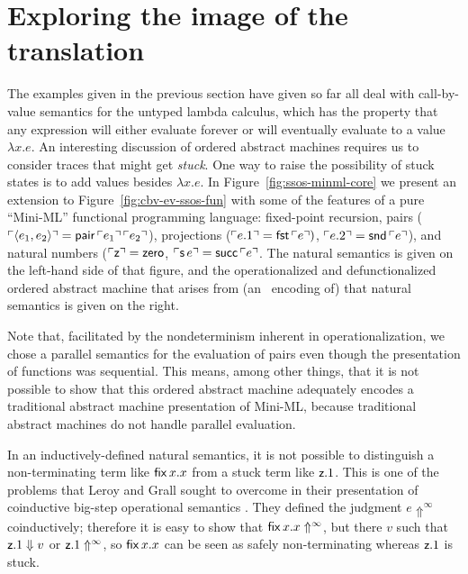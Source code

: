 \section{Exploring the image of the translation}
\label{sec:absmachine-nondeterminism}

The examples given in the previous section have given so far all deal
with call-by-value semantics for the untyped lambda calculus, which
has the property that any expression will either evaluate forever or
will eventually evaluate to a value $\lambda x. e$. An interesting
discussion of ordered abstract machines requires us to consider traces
that might get {\it stuck}. One way to raise the possibility of stuck
states is to add values besides $\lambda x.e$. In
Figure~\ref{fig:ssos-minml-core} we present an extension to
Figure~\ref{fig:cbv-ev-ssos-fun} with some of the features of a pure
``Mini-ML'' functional programming language: fixed-point recursion,
pairs (${\ulcorner{\langle e_1, e_2 \rangle}\urcorner} = {\sf
  pair}\,{\ulcorner{e_1}\urcorner}\,{\ulcorner{e_2}\urcorner}$), projections (${\ulcorner{e.1}\urcorner} =
{\sf fst}\,{\ulcorner{e}\urcorner})$, ${\ulcorner{e.2}\urcorner} = {\sf snd}\,{\ulcorner{e}\urcorner}$), and
natural numbers (${\ulcorner{{\sf z}}\urcorner} = {\sf zero}$, ${\ulcorner{{\sf s}\,e}\urcorner}
= {\sf succ}\,{\ulcorner{e}\urcorner}$.  The natural semantics is given on the
left-hand side of that figure, and the operationalized and
defunctionalized ordered abstract machine that arises from (an
\sls~encoding of) that natural semantics is given on the right. 

Note that, facilitated by the nondeterminism inherent in
operationalization, we chose a parallel semantics for the evaluation
of pairs even though the presentation of functions was sequential.
This means, among other things, that it is not possible to show that
this ordered abstract machine adequately encodes a traditional
abstract machine presentation of Mini-ML, because traditional abstract
machines do not handle parallel evaluation.

In an inductively-defined natural semantics, it is not possible to
distinguish a non-terminating term like ${\sf fix}\,x.x$ from a stuck
term like ${\sf z}.1$.  This is one of the problems that Leroy and
Grall sought to overcome in their presentation of coinductive big-step
operational semantics \cite{leroy09coinductive}. They defined the
judgment $e \Uparrow^\infty$ coinductively; therefore it is easy to
show that ${\sf fix}\,x.x \Uparrow^\infty$, but there $v$ such that
${\sf z}.1 \Downarrow v$ or ${\sf z}.1 \Uparrow^\infty$, so 
${\sf fix}\,x.x$ can be seen as safely non-terminating whereas 
${\sf z}.1$ is stuck. 

